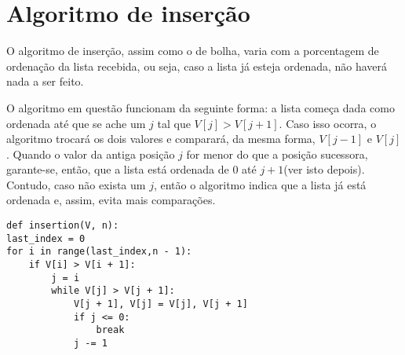 \section{Algoritmo de inserção}
O algoritmo de inserção, assim como o de bolha, varia com a porcentagem de ordenação da lista recebida, ou seja, caso a lista já esteja ordenada, não haverá nada a ser feito. 


O algoritmo em questão funcionam da seguinte forma: a lista começa dada como ordenada até que se ache um $j$ tal que $V[j]>V[j+1]$. Caso isso ocorra, o algoritmo trocará os dois valores e comparará, da mesma forma, $V[j-1]$ e $V[j]$. Quando o valor da antiga posição $j$ for menor do que a posição sucessora, garante-se, então, que a lista está ordenada de 0 até $j+1$(ver isto depois). Contudo, caso não exista um $j$, então o algoritmo indica que a lista já está ordenada e, assim, evita mais comparações.
\\

\begin{lstlisting}
def insertion(V, n):
last_index = 0
for i in range(last_index,n - 1):
    if V[i] > V[i + 1]:
        j = i
        while V[j] > V[j + 1]:
            V[j + 1], V[j] = V[j], V[j + 1]
            if j <= 0:
                break
            j -= 1
\end{lstlisting}